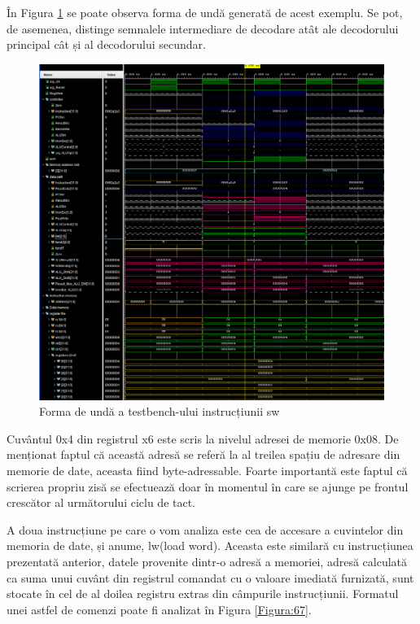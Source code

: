 \documentclass[12pt]{article}
\begin{document}
În Figura \ref{Figura:66} se poate observa forma de undă generată de acest exemplu. Se pot, de asemenea, distinge semnalele intermediare de decodare atât ale decodorului principal cât și al decodorului secundar.
\newpage

  \begin{figure}[h!]
 \hspace*{-0.1cm}\includegraphics[width=1\textwidth]{swexample.png}
 \centering
 \caption{Forma de undă a testbench-ului instrucțiunii sw}
 \label{Figura:66}
 \end{figure}
 
 Cuvântul 0x4 din registrul x6 este scris la nivelul adresei de memorie 0x08. De menționat faptul că această adresă se referă la al treilea spațiu de adresare din memorie de date, aceasta fiind byte-adressable. Foarte importantă este faptul că scrierea propriu zisă se efectuează doar în momentul în care se ajunge pe frontul crescător al următorului ciclu de tact.
 
A doua instrucțiune pe care o vom analiza este cea de accesare a cuvintelor din memoria de date, și anume, lw(load word). Aceasta este similară cu instrucțiunea prezentată anterior, datele provenite dintr-o adresă a memoriei, adresă calculată ca suma unui cuvânt din registrul comandat cu o valoare imediată furnizată, sunt stocate în cel de al doilea registru extras din câmpurile instrucțiunii. Formatul unei astfel de comenzi poate fi analizat în Figura  \ref{Figura:67}.
\end{document}
